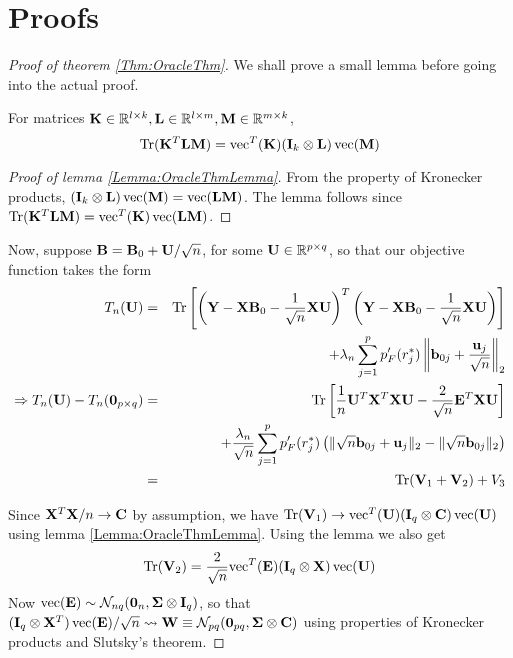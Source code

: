 \section{Proofs}
\label{section:regression-sec8}

\begin{proof}[Proof of theorem \ref{Thm:OracleThm}]

We shall prove a small lemma before going into the actual proof.

\begin{Lemma}\label{Lemma:OracleThmLemma}
For matrices ${\mathbf{K}} \in \mathbb R^{l \times k}, {\mathbf{L}} \in \mathbb R^{l \times m}, {\mathbf{M}} \in \mathbb R^{m \times k}$,
%
$$
\operatorname*{Tr} ({\mathbf{K}}^T {\mathbf{L}} {\mathbf{M}}) = {\operatorname*{\text{vec}}}^T ({\mathbf{K}}) ({\mathbf{I}}_k \otimes {\mathbf{L}} ) \operatorname*{\text{vec}} ({\mathbf{M}})
$$
%
\end{Lemma}

\begin{proof}[Proof of lemma \ref{Lemma:OracleThmLemma}]
From the property of Kronecker products, $({\mathbf{I}}_k \otimes {\mathbf{L}}) \operatorname*{\text{vec}}({\mathbf{M}}) = \operatorname*{\text{vec}} ({\mathbf{L}}{\mathbf{M}})$. The lemma follows since $\operatorname*{Tr} ({\mathbf{K}}^T {\mathbf{L}} {\mathbf{M}}) = \operatorname*{\text{vec}}^T ({\mathbf{K}}) \operatorname*{\text{vec}}({\mathbf{L}}{\mathbf{M}})$.
\end{proof}

Now, suppose ${\mathbf{B}} = {\mathbf{B}}_0 + {\mathbf{U}}/\sqrt n$, for some ${\mathbf{U}} \in \mathbb R^{p \times q}$, so that our objective function takes the form
%
\begin{eqnarray}\label{eqn:OracleThmEqn1}
T_n ({\mathbf{U}}) &=& \operatorname*{Tr} \left[ \left( {\mathbf{Y}} - {\mathbf{X}}{\mathbf{B}}_0 - \frac{1}{\sqrt n}{\mathbf{X}}{\mathbf{U}} \right)^T \left( {\mathbf{Y}} - {\mathbf{X}}{\mathbf{B}}_0 - \frac{1}{\sqrt n}{\mathbf{X}}{\mathbf{U}} \right)\right] \notag\\
&& + \lambda_n \sum_{j=1}^p p'_F ( r_j^*) \left\| {\bf{b}}_{0j} + \frac{{\bf{u}}_j}{\sqrt n} \right\|_2 \notag\\
\Rightarrow T_n ({\mathbf{U}}) - T_n ({\bf 0}_{p \times q}) &=& \operatorname*{Tr} \left[ \frac{1}{n} {\mathbf{U}}^T {\mathbf{X}}^T {\mathbf{X}} {\mathbf{U}} - \frac{2}{\sqrt n} {\mathbf{E}}^T {\mathbf{X}}{\mathbf{U}}\right] \notag\\
&& + \frac{\lambda_n}{\sqrt n} \sum_{j=1}^p p'_F ( r_j^*) \left( \| \sqrt n{\bf{b}}_{0j} + {\bf{u}}_j \|_2 - \| \sqrt n{\bf{b}}_{0j} \|_2 \right)  \notag\\
&=& \operatorname*{Tr} ({\mathbf{V}}_1 + {\mathbf{V}}_2) + V_3
\end{eqnarray}

Since ${\mathbf{X}}^T{\mathbf{X}}/n \rightarrow {\mathbf{C}}$ by assumption, we have $\operatorname*{Tr}({\mathbf{V}}_1) \rightarrow \operatorname*{\text{vec}}^T ({\mathbf{U}})({\mathbf{I}}_q \otimes {\mathbf{C}}) \operatorname*{\text{vec}}({\mathbf{U}})$ using lemma \ref{Lemma:OracleThmLemma}. Using the lemma we also get
%
$$
\operatorname*{Tr}({\mathbf{V}}_2) = \frac{2}{\sqrt n} {\operatorname*{\text{vec}}}^T({\mathbf{E}}) ({\mathbf{I}}_q \otimes {\mathbf{X}}) \operatorname*{\text{vec}} ({\mathbf{U}})
$$
%
Now $\operatorname*{\text{vec}}({\mathbf{E}}) \sim \mathcal N_{nq} ({\bf 0}_n, {\boldsymbol{\Sigma}} \otimes {\mathbf{I}}_q)$, so that $({\mathbf{I}}_q \otimes {\mathbf{X}}^T) \operatorname*{\text{vec}}({\mathbf{E}})/\sqrt n \leadsto {\mathbf{W}} \equiv \mathcal N_{pq} ({\bf 0}_{pq}, {\boldsymbol{\Sigma}} \otimes {\mathbf{C}})$ using properties of Kronecker products and Slutsky's theorem.


\end{proof}
